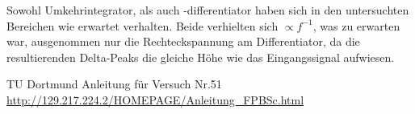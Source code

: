Sowohl Umkehrintegrator, als auch -differentiator haben sich in den untersuchten Bereichen wie erwartet verhalten. Beide verhielten sich $\propto f^{-1}$, was zu erwarten war, ausgenommen nur die Rechteckspannung am Differentiator, da die resultierenden Delta-Peaks die gleiche Höhe wie das Eingangssignal aufwiesen.

\newpage
 \begin{thebibliography}{WissOnl}
 	 TU Dortmund Anleitung für Versuch Nr.51 \url{http://129.217.224.2/HOMEPAGE/Anleitung_FPBSc.html}
 	\end{thebibliography}




